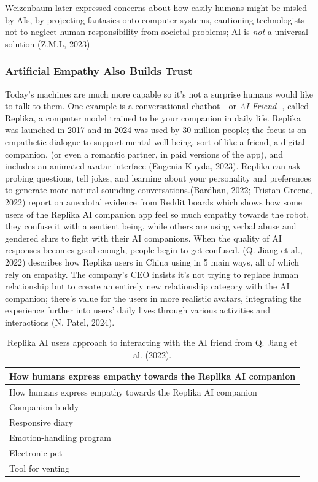 \documentclass[
  12pt,
  letterpaper,
  DIV=11,
  numbers=noendperiod]{scrartcl}
\begin{document}
Weizenbaum later expressed concerns about how easily humans might be
misled by AIs, by projecting fantasies onto computer systems, cautioning
technologists not to neglect human responsibility from societal
problems; AI is \emph{not} a universal solution (Z.M.L, 2023)

\subsubsection{Artificial Empathy Also Builds
Trust}\label{artificial-empathy-also-builds-trust}

Today's machines are much more capable so it's not a surprise humans
would like to talk to them. One example is a conversational chatbot - or
\emph{AI Friend} -, called Replika, a computer model trained to be your
companion in daily life. Replika was launched in 2017 and in 2024 was
used by 30 million people; the focus is on empathetic dialogue to
support mental well being, sort of like a friend, a digital companion,
(or even a romantic partner, in paid versions of the app), and includes
an animated avatar interface (Eugenia Kuyda, 2023). Replika can ask
probing questions, tell jokes, and learning about your personality and
preferences to generate more natural-sounding conversations.(Bardhan,
2022; Tristan Greene, 2022) report on anecdotal evidence from Reddit
boards which shows how some users of the Replika AI companion app feel
so much empathy towards the robot, they confuse it with a sentient
being, while others are using verbal abuse and gendered slurs to fight
with their AI companions. When the quality of AI responses becomes good
enough, people begin to get confused. (Q. Jiang et al., 2022) describes
how Replika users in China using in 5 main ways, all of which rely on
empathy. The company's CEO insists it's not trying to replace human
relationship but to create an entirely new relationship category with
the AI companion; there's value for the users in more realistic avatars,
integrating the experience further into users' daily lives through
various activities and interactions (N. Patel, 2024).

\def\pandoctableshortcapt{Replika AI Users and AI Friends}

\begin{longtable}[]{@{}l@{}}
\caption[Replika AI Users and AI Friends]{Replika AI users approach to
interacting with the AI friend from Q. Jiang et al.
(2022).}\tabularnewline
\toprule\noalign{}
How humans express empathy towards the Replika AI companion \\
\midrule\noalign{}
\endfirsthead
\toprule\noalign{}
How humans express empathy towards the Replika AI companion \\
\midrule\noalign{}
\endhead
\bottomrule\noalign{}
\endlastfoot
Companion buddy \\
Responsive diary \\
Emotion-handling program \\
Electronic pet \\
Tool for venting \\
\end{longtable}
\end{document}
